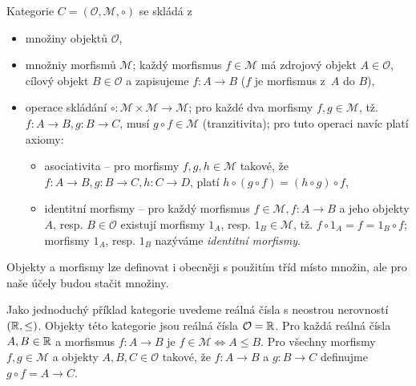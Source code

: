 Kategorie $C=(\mathcal O, \mathcal M, \circ)$ se skládá
z~\begin{itemize}
  \item množiny objektů $\mathcal O$,
  \item množniy morfismů $\mathcal M$; každý morfismus $f \in \mathcal M$ má zdrojový objekt $A\in\mathcal O$, cílový objekt $B\in\mathcal O$ a zapisujeme $f: A\to B$ ($f$ je morfismus z~$A$ do $B$),
  \item operace skládání $\circ\colon \mathcal M\times\mathcal M \to \mathcal M$; pro každé dva morfismy $f,g\in\mathcal M$, tž. $f\colon A\to B, g\colon B\to C$, musí $g\circ f\in \mathcal M$ (tranzitivita); pro tuto operaci navíc platí axiomy:
        \begin{itemize}
          \item asociativita -- pro morfismy $f,g,h\in\mathcal M$ takové, že $f\colon A\to B, g\colon B\to C, h\colon C\to D$, platí $h\circ (g \circ f) = (h\circ g)\circ f$,
          \item identitní morfismy -- pro každý morfismus $f\in\mathcal M, f\colon A\to B$ a jeho objekty $A$, resp. $B\in\mathcal O$ existují morfismy $1_A$, resp. $1_B\in\mathcal M$, tž. $f\circ 1_A = f = 1_B\circ f$; morfismy $1_A$, resp. $1_B$ nazýváme \emph{identitní morfismy}.
        \end{itemize}
\end{itemize}

Objekty a morfismy lze definovat i obecněji s použitím tříd místo množin, ale pro naše účely budou stačit množiny.

Jako jednoduchý příklad kategorie uvedeme reálná čísla s neostrou nerovností $(\mathbb{R}, \leq)$. Objekty této kategorie jsou reálná čísla $\mathcal O=\mathbb{R}$.
Pro každá reálná čísla $A,B\in\mathbb{R}$ a morfismus $f\colon A\to B$ je $f\in\mathcal M\iff A\leq B$.
Pro všechny morfismy $f,g\in\mathcal M$ a objekty $A, B, C\in\mathcal O$ takové, že $f\colon A\to B$ a $g\colon B\to C$ definujme $g\circ f=A\to C$.

